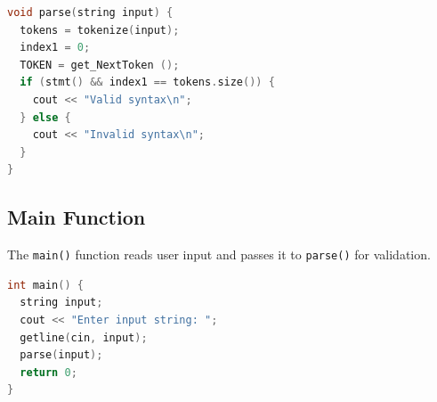 \documentclass[12pt]{article}
\begin{document}
\begin{lstlisting}[language=C++]
void parse(string input) {
  tokens = tokenize(input);
  index1 = 0;
  TOKEN = get_NextToken ();
  if (stmt() && index1 == tokens.size()) {
    cout << "Valid syntax\n";
  } else {
    cout << "Invalid syntax\n";
  }
}
\end{lstlisting}

\subsection{Main Function}
The \texttt{main()} function reads user input and passes it to \texttt{parse()} for validation.
\begin{lstlisting}[language=C++]
int main() {
  string input;
  cout << "Enter input string: ";
  getline(cin, input);
  parse(input);
  return 0;
}
\end{lstlisting}
\end{document}
